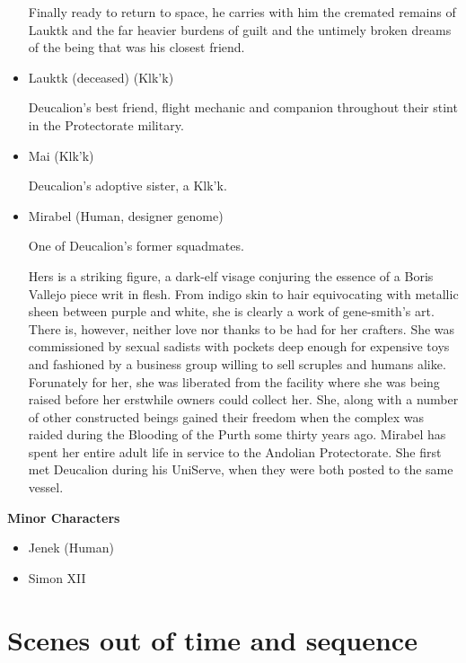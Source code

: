 \begin{itemize}
Finally ready to return to space, he carries with him the cremated
remains of Lauktk and the far heavier burdens of guilt and the
untimely broken dreams of the being that was his closest friend.

\item Lauktk (deceased) (Klk'k) 

Deucalion's best friend, flight mechanic and
companion throughout their stint in the Protectorate military.

\item Mai (Klk'k)

Deucalion's adoptive sister, a Klk'k.

\item Mirabel (Human, designer genome)

One of Deucalion's former squadmates. 

Hers is a striking figure, a dark-elf visage conjuring the essence of
a Boris Vallejo piece writ in flesh. From indigo skin to hair
equivocating with metallic sheen between purple and white, she is
clearly a work of gene-smith's art. There is, however, neither love
nor thanks to be had for her crafters. She was commissioned by sexual
sadists with pockets deep enough for expensive toys and fashioned by a
business group willing to sell scruples and humans alike. Forunately
for her, she was liberated from the facility where she was being
raised before her erstwhile owners could collect her. She, along with
a number of other constructed beings gained their freedom when the
complex was raided during the Blooding of the Purth some thirty years
ago. Mirabel has spent her entire adult life in service to the
Andolian Protectorate. She first met Deucalion during his UniServe,
when they were both posted to the same vessel.
\end{itemize}

{\bf Minor Characters}

\begin{itemize}
\item Jenek (Human) 

\item Simon XII
\end{itemize}

\section{Scenes out of time and sequence}

